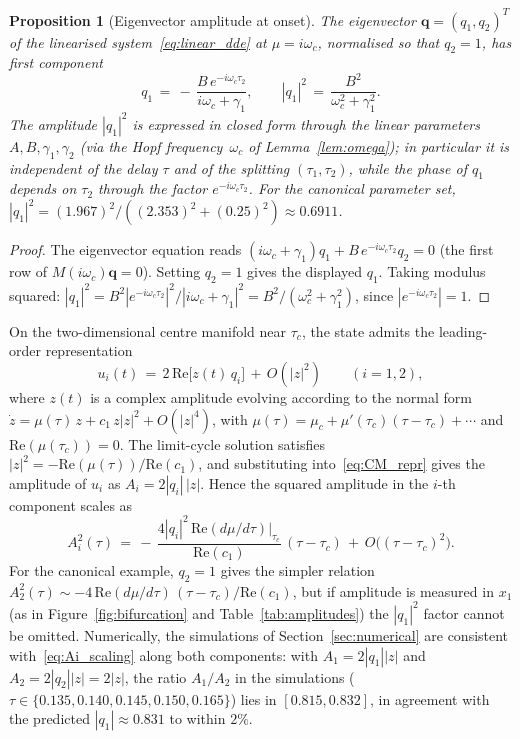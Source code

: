 \documentclass[sn-mathphys,Numbered]{sn-jnl}
\theoremstyle{thmstyleone}
\newtheorem{proposition}[theorem]{Proposition}
\theoremstyle{thmstyletwo}
\theoremstyle{thmstylethree}
\begin{document}
\begin{proposition}[Eigenvector amplitude at onset]
\label{prop:eigvec_amplitude}
The eigenvector $\mathbf{q}=(q_1,q_2)^T$ of the linearised
system~\eqref{eq:linear_dde} at $\mu=i\omega_c$, normalised so that
$q_2=1$, has first component
\begin{equation}
q_1 \,=\, -\,\frac{B\,e^{-i\omega_c\tau_2}}{i\omega_c+\gamma_1},
\qquad
|q_1|^{2} \,=\, \frac{B^{2}}{\omega_c^{2}+\gamma_1^{2}}.
\label{eq:q1_amplitude}
\end{equation}
The amplitude $|q_1|^{2}$ is expressed in closed form through the linear
parameters $A,B,\gamma_1,\gamma_2$ (via the Hopf
frequency~$\omega_c$ of Lemma~\ref{lem:omega}); in particular it is
independent of the delay $\tau$ and of the splitting
$(\tau_1,\tau_2)$, while the phase of $q_1$ depends on $\tau_2$
through the factor $e^{-i\omega_c\tau_2}$. For the canonical
parameter set,
$|q_1|^{2} = (1.967)^{2}/((2.353)^{2}+(0.25)^{2}) \approx 0.6911$.
\end{proposition}
\begin{proof}
The eigenvector equation reads
$(i\omega_c+\gamma_1)q_1 + B\,e^{-i\omega_c\tau_2}q_2 = 0$ (the first
row of $M(i\omega_c)\mathbf{q}=0$). Setting $q_2=1$ gives the
displayed $q_1$. Taking modulus squared:
$|q_1|^{2} = B^{2}|e^{-i\omega_c\tau_2}|^{2}/|i\omega_c+\gamma_1|^{2}
= B^{2}/(\omega_c^{2}+\gamma_1^{2})$, since $|e^{-i\omega_c\tau_2}|=1$.
\end{proof}

On the two-dimensional centre manifold near $\tau_c$, the state
admits the leading-order representation
\begin{equation}
u_i(t) \,=\, 2\,\mathrm{Re}\!\bigl[z(t)\,q_i\bigr] \,+\, O(|z|^{2})
\qquad (i=1,2),
\label{eq:CM_repr}
\end{equation}
where $z(t)$ is a complex amplitude evolving according to the normal
form $\dot{z}=\mu(\tau)\,z + c_1\,z|z|^{2}+O(|z|^{4})$, with
$\mu(\tau)=\mu_c+\mu'(\tau_c)(\tau-\tau_c)+\cdots$ and
$\mathrm{Re}(\mu(\tau_c))=0$. The limit-cycle solution satisfies
$|z|^{2} = -\mathrm{Re}(\mu(\tau))/\mathrm{Re}(c_1)$, and substituting
into~\eqref{eq:CM_repr} gives the amplitude of $u_i$ as
$A_i = 2|q_i|\,|z|$. Hence the squared amplitude in the $i$-th
component scales as
\begin{equation}
A_i^{2}(\tau)
\,=\, -\,\frac{4|q_i|^{2}\,\mathrm{Re}(d\mu/d\tau)|_{\tau_c}}
            {\mathrm{Re}(c_1)}\,(\tau-\tau_c)
\,+\, O\!\bigl((\tau-\tau_c)^{2}\bigr).
\label{eq:Ai_scaling}
\end{equation}
For the canonical example, $q_2=1$ gives the simpler relation
$A_2^{2}(\tau)\sim -4\,\mathrm{Re}(d\mu/d\tau)\,(\tau-\tau_c)/
\mathrm{Re}(c_1)$, but if amplitude is measured in $x_1$ (as in
Figure~\ref{fig:bifurcation} and Table~\ref{tab:amplitudes}) the
$|q_1|^{2}$ factor cannot be omitted. Numerically, the simulations of
Section~\ref{sec:numerical} are consistent with~\eqref{eq:Ai_scaling}
along both components: with $A_1=2|q_1||z|$ and $A_2=2|q_2||z|=2|z|$,
the ratio $A_1/A_2$ in the simulations
($\tau\in\{0.135,0.140,0.145,0.150,0.165\}$) lies in
$[0.815,0.832]$, in agreement with the predicted
$|q_1|\approx 0.831$ to within $2\%$.
\end{document}

